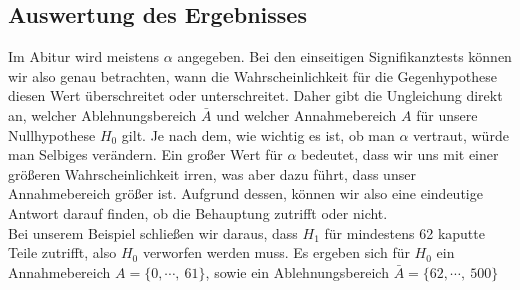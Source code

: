 \subsection{Auswertung des Ergebnisses}
	Im Abitur wird meistens \(\alpha\) angegeben. Bei den einseitigen
	Signifikanztests können wir also genau betrachten, wann die Wahrscheinlichkeit
	für die Gegenhypothese diesen Wert überschreitet oder unterschreitet. Daher
	gibt die Ungleichung direkt an, welcher Ablehnungsbereich \(\bar{A}\) und
	welcher Annahmebereich \(A\) für unsere Nullhypothese \(H_0\) gilt. Je nach
	dem, wie wichtig es ist, ob man \(\alpha\) vertraut, würde man Selbiges
	verändern. Ein großer Wert für \(\alpha\) bedeutet, dass wir uns mit einer größeren
	Wahrscheinlichkeit irren, was aber dazu führt, dass unser Annahmebereich größer
	ist. Aufgrund dessen, können wir also eine eindeutige Antwort darauf finden, ob
	die Behauptung zutrifft oder nicht.\\
	Bei unserem Beispiel schließen wir daraus, dass \(H_1\) für mindestens 62
	kaputte Teile zutrifft, also \(H_0\) verworfen werden muss.
	Es ergeben sich für \(H_0\) ein Annahmebereich \(A=\{0,\cdots,\ 61\}\), sowie
	ein Ablehnungsbereich \(\bar{A}=\{62,\cdots,\ 500\}\)
